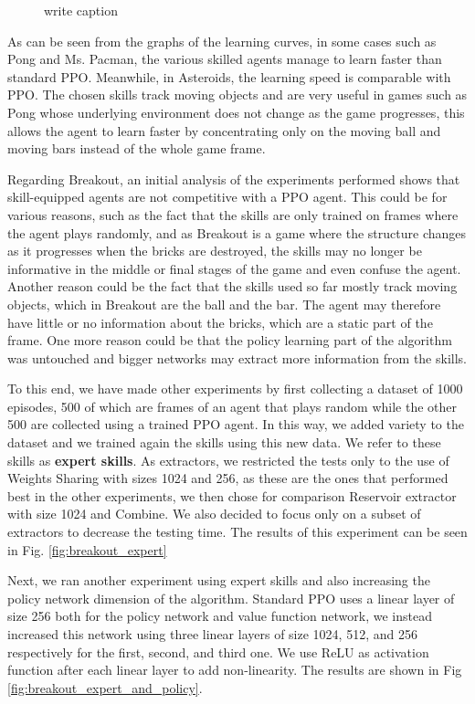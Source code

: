 \begin{figure}[htbp]
    \caption{write caption}
    \label{fig:trainresults}
\end{figure}


As can be seen from the graphs of the learning curves, in some cases such as Pong and Ms. Pacman, the various skilled agents manage to learn faster than standard PPO. Meanwhile, in Asteroids, the learning speed is comparable with PPO.
The chosen skills track moving objects and are very useful in games such as Pong whose underlying environment does not change as the game progresses, this allows the agent to learn faster by concentrating only on the moving ball and moving bars instead of the whole game frame.

Regarding Breakout, an initial analysis of the experiments performed shows that skill-equipped agents are not competitive with a PPO agent. This could be for various reasons, such as the fact that the skills are only trained on frames where the agent plays randomly, and as Breakout is a game where the structure changes as it progresses when the bricks are destroyed, the skills may no longer be informative in the middle or final stages of the game and even confuse the agent.
Another reason could be the fact that the skills used so far mostly track moving objects, which in Breakout are the ball and the bar. The agent may therefore have little or no information about the bricks, which are a static part of the frame.
One more reason could be that the policy learning part of the algorithm was untouched and bigger networks may extract more information from the skills.

To this end, we have made other experiments by first collecting a dataset of 1000 episodes, 500 of which are frames of an agent that plays random while the other 500 are collected using a trained PPO agent. In this way, we added variety to the dataset and we trained again the skills using this new data. We refer to these skills as \textbf{expert skills}.
As extractors, we restricted the tests only to the use of Weights Sharing with sizes 1024 and 256, as these are the ones that performed best in the other experiments, we then chose for comparison Reservoir extractor with size 1024 and Combine. We also decided to focus only on a subset of extractors to decrease the testing time.
The results of this experiment can be seen in Fig. \ref{fig:breakout_expert}

Next, we ran another experiment using expert skills and also increasing the policy network dimension of the algorithm. Standard PPO uses a linear layer of size 256 both for the policy network and value function network, we instead increased this network using three linear layers of size 1024, 512, and 256 respectively for the first, second, and third one. We use ReLU as activation function after each linear layer to add non-linearity.
The results are shown in Fig \ref{fig:breakout_expert_and_policy}.

